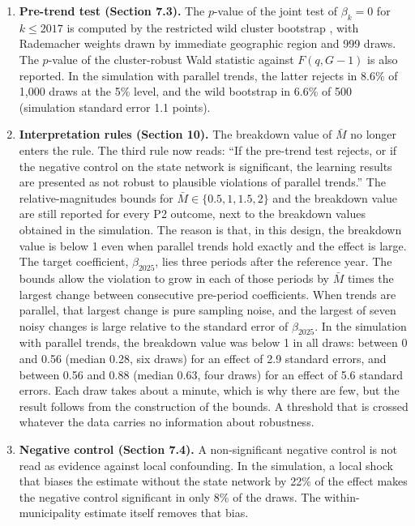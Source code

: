 \documentclass[11pt]{article}
\begin{document}
\begin{enumerate}[label=\arabic*.]
\item \textbf{Pre-trend test (Section 7.3).} The $p$-value of the joint test of $\beta_k = 0$ for $k \le 2017$ is computed by the restricted wild cluster bootstrap \citep{cameron2008}, with Rademacher weights drawn by immediate geographic region and 999 draws. The $p$-value of the cluster-robust Wald statistic against $F(q, G-1)$ is also reported. In the simulation with parallel trends, the latter rejects in 8.6\% of 1,000 draws at the 5\% level, and the wild bootstrap in 6.6\% of 500 (simulation standard error 1.1 points).

\item \textbf{Interpretation rules (Section 10).} The breakdown value of $\bar M$ no longer enters the rule. The third rule now reads: ``If the pre-trend test rejects, or if the negative control on the state network is significant, the learning results are presented as not robust to plausible violations of parallel trends.'' The relative-magnitudes bounds for $\bar M \in \{0.5, 1, 1.5, 2\}$ and the breakdown value are still reported for every P2 outcome, next to the breakdown values obtained in the simulation. The reason is that, in this design, the breakdown value is below 1 even when parallel trends hold exactly and the effect is large. The target coefficient, $\beta_{2025}$, lies three periods after the reference year. The bounds allow the violation to grow in each of those periods by $\bar M$ times the largest change between consecutive pre-period coefficients. When trends are parallel, that largest change is pure sampling noise, and the largest of seven noisy changes is large relative to the standard error of $\beta_{2025}$. In the simulation with parallel trends, the breakdown value was below 1 in all draws: between 0 and 0.56 (median 0.28, six draws) for an effect of 2.9 standard errors, and between 0.56 and 0.88 (median 0.63, four draws) for an effect of 5.6 standard errors. Each draw takes about a minute, which is why there are few, but the result follows from the construction of the bounds. A threshold that is crossed whatever the data carries no information about robustness.

\item \textbf{Negative control (Section 7.4).} A non-significant negative control is not read as evidence against local confounding. In the simulation, a local shock that biases the estimate without the state network by 22\% of the effect makes the negative control significant in only 8\% of the draws. The within-municipality estimate itself removes that bias.
\end{enumerate}
\end{document}
